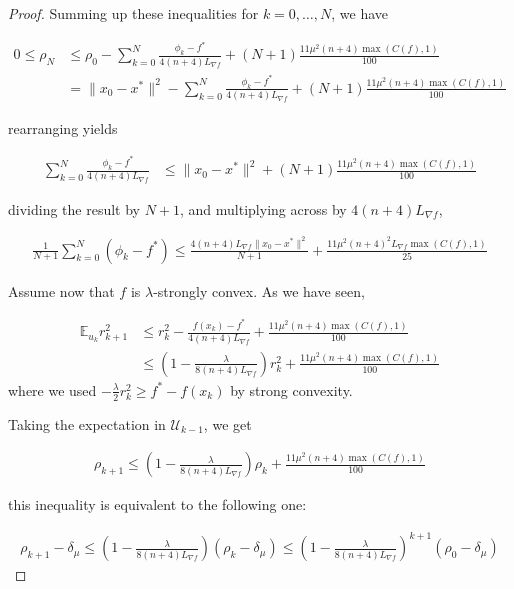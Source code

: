 \documentclass{article}
\begin{document}
\begin{theorem}
\begin{proof}
Summing up these inequalities for $k = 0, \dots, N$, we have 

\begin{align*}
0 \leq \rho_N  &  \leq \rho_0 - \sum_{k=0}^N \frac{\phi_k - f^*}{4(n+4)L_{\nabla f}} + (N+1)\frac{11\mu^2(n+4)\max(C(f),1)}{100} \\ & = \|x_0 - x^*\|^2 - \sum_{k=0}^{N}\frac{\phi_k - f^*}{4(n+4)L_{\nabla f}} + (N+1)\frac{11\mu^2(n+4)\max(C(f),1)}{100}
\end{align*}

rearranging yields

\begin{align*}
\sum_{k=0}^N\frac{\phi_k - f^*}{4(n+4)L_{\nabla f}} & \leq \|x_0 - x^*\|^2 + (N+1)\frac{11\mu^2(n+4)\max(C(f),1)}{100}
\end{align*}

dividing the result by $N+1$, and multiplying across by $4(n+4)L_{\nabla f}$,

\begin{align*}
\frac{1}{N+1}\sum_{k=0}^{N}(\phi_k-f^*) \leq \frac{4(n+4)L_{\nabla f}\|x_0 - x^*\|^2}{N+1} + \frac{11\mu^2(n+4)^2L_{\nabla f}\max(C(f),1)}{25}
\end{align*}

Assume now that $f$ is $\lambda$-strongly convex. As we have seen, 

\begin{align*}
\mathbb{E}_{u_k}r_{k+1}^2 & \leq r_k^2 - \frac{f(x_k)-f^*}{4(n+4)L_{\nabla f}} + \frac{11\mu^2(n+4)\max(C(f),1)}{100} \\ & \leq \left(1 - \frac{\lambda}{8(n+4)L_{\nabla f}}\right)r_k^2 + \frac{11\mu^2(n+4)\max(C(f),1)}{100}
\end{align*}
where we used $-\frac{\lambda}{2}r_k^2 \geq f^* - f(x_k)$ by strong convexity. \newline 

Taking the expectation in $\mathcal{U}_{k-1}$, we get

\begin{align*}
\rho_{k+1} \leq \left(1 - \frac{\lambda}{8(n+4)L_{\nabla f}}\right)\rho_k + \frac{11\mu^2(n+4)\max(C(f),1)}{100}
\end{align*}

this inequality is equivalent to the following one: 

\begin{align}
\rho_{k+1} - \delta_{\mu} \leq \left(1 - \frac{\lambda }{8(n+4)L_{\nabla f}}\right)(\rho_k - \delta_{\mu}) \leq \left(1 - \frac{\lambda}{8(n+4)L_{\nabla f}}\right)^{k+1}(\rho_0 - \delta_{\mu}) \label{August10_convergence_analysis_5}
\end{align}


\end{proof}
\end{theorem}
\end{document}
